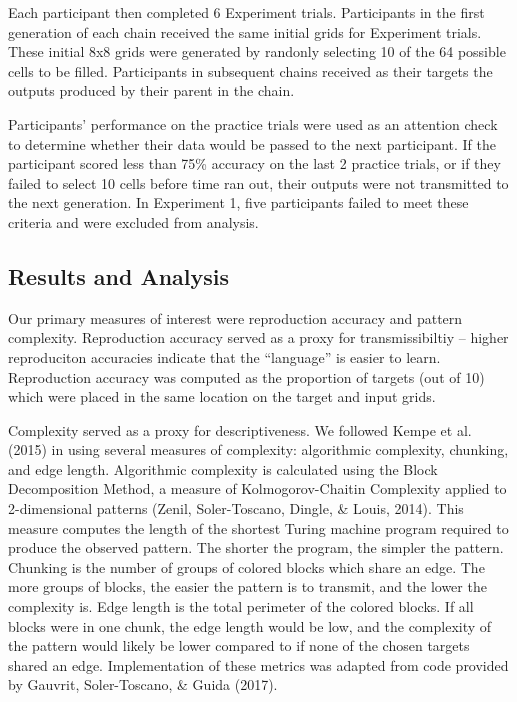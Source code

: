 \documentclass[10pt, letterpaper]{article}
\begin{document}
Each participant then completed 6 Experiment trials. Participants in the
first generation of each chain received the same initial grids for
Experiment trials. These initial 8x8 grids were generated by randonly
selecting 10 of the 64 possible cells to be filled. Participants in
subsequent chains received as their targets the outputs produced by
their parent in the chain.

Participants' performance on the practice trials were used as an
attention check to determine whether their data would be passed to the
next participant. If the participant scored less than 75\% accuracy on
the last 2 practice trials, or if they failed to select 10 cells before
time ran out, their outputs were not transmitted to the next generation.
In Experiment 1, five participants failed to meet these criteria and
were excluded from analysis.

\subsection{Results and Analysis}\label{results-and-analysis}

Our primary measures of interest were reproduction accuracy and pattern
complexity. Reproduction accuracy served as a proxy for transmissibiltiy
-- higher reproduciton accuracies indicate that the ``language'' is
easier to learn. Reproduction accuracy was computed as the proportion of
targets (out of 10) which were placed in the same location on the target
and input grids.

Complexity served as a proxy for descriptiveness. We followed Kempe et
al. (2015) in using several measures of complexity: algorithmic
complexity, chunking, and edge length. Algorithmic complexity is
calculated using the Block Decomposition Method, a measure of
Kolmogorov-Chaitin Complexity applied to 2-dimensional patterns (Zenil,
Soler-Toscano, Dingle, \& Louis, 2014). This measure computes the length
of the shortest Turing machine program required to produce the observed
pattern. The shorter the program, the simpler the pattern. Chunking is
the number of groups of colored blocks which share an edge. The more
groups of blocks, the easier the pattern is to transmit, and the lower
the complexity is. Edge length is the total perimeter of the colored
blocks. If all blocks were in one chunk, the edge length would be low,
and the complexity of the pattern would likely be lower compared to if
none of the chosen targets shared an edge. Implementation of these
metrics was adapted from code provided by Gauvrit, Soler-Toscano, \&
Guida (2017).
\end{document}
